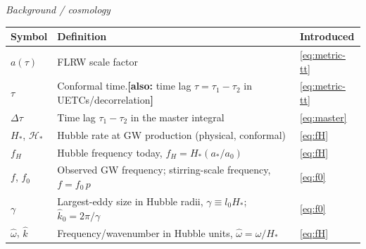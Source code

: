\documentclass[10pt,prd,aps,nobibnotes,superscriptaddress,preprintnumbers,notitlepage]{revtex4-1}
\begin{document}
\medskip\noindent \emph{Background / cosmology}\par\nobreak\smallskip
\noindent\begin{tabular}{@{}p{} p{} p{}@{}}
\hline\hline
Symbol & Definition & Introduced \\
\hline
$a(\tau)$             & FLRW scale factor & \eqref{eq:metric-tt}\\
$\tau$\;[MULTI]       & Conformal time.\quad\textbf{[also:} time lag $\tau=\tau_1-\tau_2$ in UETCs/decorrelation\textbf{]} & \eqref{eq:metric-tt}\\
$\Delta\tau$          & Time lag $\tau_1-\tau_2$ in the master integral & \eqref{eq:master}\\
$H_\ast$, $\mathcal{H}_\ast$ & Hubble rate at GW production (physical, conformal) & \eqref{eq:fH}\\
$f_H$                 & Hubble frequency today, $f_H=H_\ast(a_\ast/a_0)$ & \eqref{eq:fH}\\
$f$, $f_0$            & Observed GW frequency; stirring-scale frequency, $f=f_0\,p$ & \eqref{eq:f0}\\
$\gamma$              & Largest-eddy size in Hubble radii, $\gamma\equiv l_0H_\ast$; $\hat k_0=2\pi/\gamma$ & \eqref{eq:f0}\\
$\hat\omega$, $\hat k$ & Frequency/wavenumber in Hubble units, $\hat\omega=\omega/H_\ast$ & \eqref{eq:fH}\\
\hline\hline
\end{tabular}\par
\end{document}
